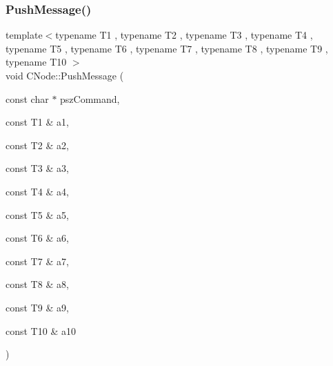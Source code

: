 \subsubsection{\texorpdfstring{Push\+Message()}{PushMessage()}\hspace{0.1cm}{\footnotesize\ttfamily [11/13]}}
{\footnotesize\ttfamily template$<$typename T1 , typename T2 , typename T3 , typename T4 , typename T5 , typename T6 , typename T7 , typename T8 , typename T9 , typename T10 $>$ \\
void C\+Node\+::\+Push\+Message (\begin{DoxyParamCaption}\item[{const char $\ast$}]{psz\+Command,  }\item[{const T1 \&}]{a1,  }\item[{const T2 \&}]{a2,  }\item[{const T3 \&}]{a3,  }\item[{const T4 \&}]{a4,  }\item[{const T5 \&}]{a5,  }\item[{const T6 \&}]{a6,  }\item[{const T7 \&}]{a7,  }\item[{const T8 \&}]{a8,  }\item[{const T9 \&}]{a9,  }\item[{const T10 \&}]{a10 }\end{DoxyParamCaption})\hspace{0.3cm}{\ttfamily [inline]}}

\mbox{\label{class_c_node_afeef78359562e34d7e62cbea4bc628fd}} 
